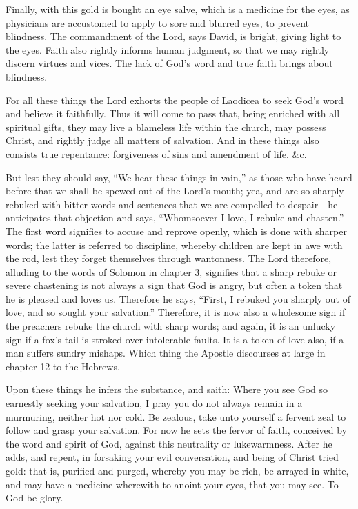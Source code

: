 Finally, with this gold is bought an eye salve, which is a medicine for the eyes, as physicians are accustomed to apply to sore and blurred eyes, to prevent blindness. The commandment of the Lord, says David, is bright, giving light to the eyes. Faith also rightly informs human judgment, so that we may rightly discern virtues and vices. The lack of God’s word and true faith brings about blindness.

For all these things the Lord exhorts the people of Laodicea to seek God’s word and believe it faithfully. Thus it will come to pass that, being enriched with all spiritual gifts, they may live a blameless life within the church, may possess Christ, and rightly judge all matters of salvation. And in these things also consists true repentance: forgiveness of sins and amendment of life. \&c.

But lest they should say, “We hear these things in vain,” as those who have heard before that we shall be spewed out of the Lord’s mouth; yea, and are so sharply rebuked with bitter words and sentences that we are compelled to despair—he anticipates that objection and says, “Whomsoever I love, I rebuke and chasten.” The first word signifies to accuse and reprove openly, which is done with sharper words; the latter is referred to discipline, whereby children are kept in awe with the rod, lest they forget themselves through wantonness. The Lord therefore, alluding to the words of Solomon in chapter 3, signifies that a sharp rebuke or severe chastening is not always a sign that God is angry, but often a token that he is pleased and loves us. Therefore he says, “First, I rebuked you sharply out of love, and so sought your salvation.” Therefore, it is now also a wholesome sign if the preachers rebuke the church with sharp words; and again, it is an unlucky sign if a fox’s tail is stroked over intolerable faults. It is a token of love also, if a man suffers sundry mishaps. Which thing the Apostle discourses at large in chapter 12 to the Hebrews.

Upon these things he infers the substance, and saith: Where you see God so earnestly seeking your salvation, I pray you do not always remain in a murmuring, neither hot nor cold. Be zealous, take unto yourself a fervent zeal to follow and grasp your salvation. For now he sets the fervor of faith, conceived by the word and spirit of God, against this neutrality or lukewarmness. After he adds, and repent, in forsaking your evil conversation, and being of Christ tried gold: that is, purified and purged, whereby you may be rich, be arrayed in white, and may have a medicine wherewith to anoint your eyes, that you may see. To God be glory.

